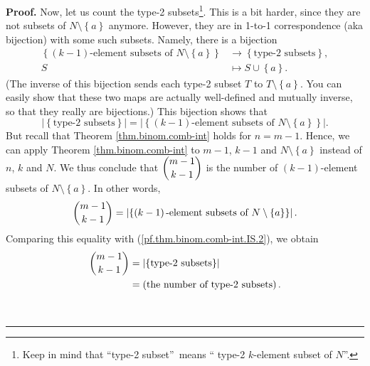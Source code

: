 \documentclass[numbers=enddot,12pt,final,onecolumn,notitlepage]{scrartcl}%
\numberwithin{exer}{subsection}
\theoremstyle{definition}
\newenvironment{proof}[1][Proof]{\noindent\textbf{#1.} }{\ \rule{0.5em}{0.5em}}
\begin{document}
\begin{proof}
Now, let us count the type-2 subsets\footnote{Keep in mind that
\textquotedblleft type-2 subset\textquotedblright\ means \textquotedblleft
type-2 $k$-element subset of $N$\textquotedblright.}. This is a bit harder,
since they are not subsets of $N\setminus\left\{  a\right\}  $ anymore.
However, they are in 1-to-1 correspondence (aka bijection) with some such
subsets. Namely, there is a bijection%
\begin{align*}
\left\{  \left(  k-1\right)  \text{-element subsets of }N\setminus\left\{
a\right\}  \right\}   &  \rightarrow\left\{  \text{type-2 subsets}\right\}
,\\
S  &  \mapsto S\cup\left\{  a\right\}  .
\end{align*}
(The inverse of this bijection sends each type-2 subset $T$ to $T\setminus
\left\{  a\right\}  $. You can easily show that these two maps are actually
well-defined and mutually inverse, so that they really are bijections.) This
bijection shows that%
\begin{equation}
\left\vert \left\{  \text{type-2 subsets}\right\}  \right\vert =\left\vert
\left\{  \left(  k-1\right)  \text{-element subsets of }N\setminus\left\{
a\right\}  \right\}  \right\vert . \label{pf.thm.binom.comb-int.IS.2}%
\end{equation}
But recall that Theorem \ref{thm.binom.comb-int} holds for $n=m-1$. Hence, we
can apply Theorem \ref{thm.binom.comb-int} to $m-1$, $k-1$ and $N\setminus
\left\{  a\right\}  $ instead of $n$, $k$ and $N$. We thus conclude that
$\dbinom{m-1}{k-1}$ is the number of $\left(  k-1\right)  $-element subsets of
$N\setminus\left\{  a\right\}  $. In other words,
\[
\dbinom{m-1}{k-1}=\left\vert \left\{  \left(  k-1\right)  \text{-element
subsets of }N\setminus\left\{  a\right\}  \right\}  \right\vert .
\]
Comparing this equality with (\ref{pf.thm.binom.comb-int.IS.2}), we obtain%
\begin{align}
\dbinom{m-1}{k-1}  &  =\left\vert \left\{  \text{type-2 subsets}\right\}
\right\vert \nonumber\\
&  =\left(  \text{the number of type-2 subsets}\right)  .
\label{pf.thm.binom.comb-int.IS.3}%
\end{align}



\end{proof}
\end{document}
